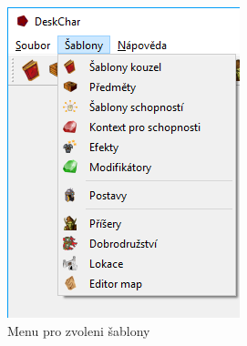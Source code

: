 \documentclass[12pt,a4paper,oneside]{article}
\begin{document}
\begin{figure}[h]
\begin{minipage}[t]{0.48\textwidth}
  			\includegraphics[width=\linewidth]{images/menu_sablony.png}
    		\caption{Menu pro zvoleni šablony}
    		\label{fig:menu_sablony}
  		\end{minipage}
	\end{figure}
	
\end{document}
